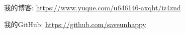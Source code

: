 

\begin{cventries}
	
	\cventry
	{} %
	{} %
	{} %
	{} %
	{
		\begin{cvitems} %
		 \item {我的博客: \url{https://www.yuque.com/u646146-axqht/iz4znd}}
		 \item {我的GitHub: \url{https://github.com/saveunhappy}} %
		\end{cvitems}
	}
	
\end{cventries}
